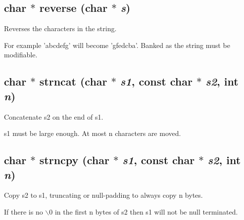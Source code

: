 \subsection{\setlength{\rightskip}{0pt plus 5cm}char $\ast$ reverse (char $\ast$ {\em s})}

Reverses the characters in the string.

For example 'abcdefg' will become 'gfedcba'. Banked as the string must be modifiable. \label{string.h_a6}
\subsection{\setlength{\rightskip}{0pt plus 5cm}char $\ast$ strncat (char $\ast$ {\em s1}, const char $\ast$ {\em s2}, int {\em n})}

Concatenate s2 on the end of s1.

s1 must be large enough. At most n characters are moved. \label{string.h_a8}
\subsection{\setlength{\rightskip}{0pt plus 5cm}char $\ast$ strncpy (char $\ast$ {\em s1}, const char $\ast$ {\em s2}, int {\em n})}

Copy s2 to s1, truncating or null-padding to always copy n bytes.

If there is no $\backslash$0 in the first n bytes of s2 then s1 will not be null terminated. 